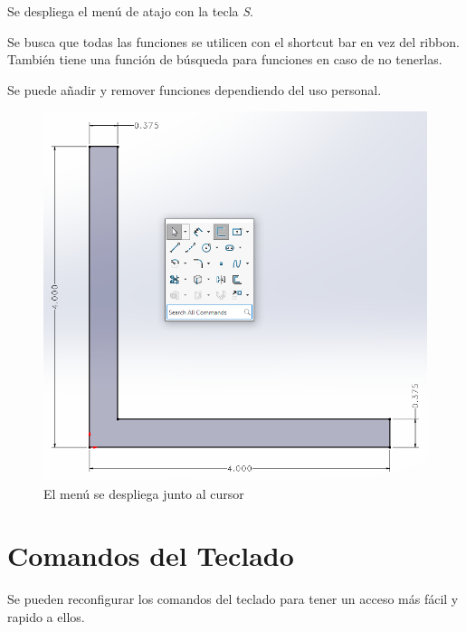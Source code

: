 \documentclass[12pt,letterpaper,final]{report}
\begin{document}
Se despliega el menú de atajo con la tecla \emph{S}.

Se busca que todas las funciones se utilicen con el shortcut bar en vez del ribbon. También tiene una función de búsqueda para funciones en caso de no tenerlas.

Se puede añadir y remover funciones dependiendo del uso personal.

\begin{figure}[H]
	\centering
	\includegraphics[width=0.85\linewidth, height=0.5\textheight,keepaspectratio]{Imagenes/solidworks_shortcutbars_07}
	\caption{El menú se despliega junto al cursor}
	\label{fig:solidworksshortcutbars07}
\end{figure}



\chapter{Comandos del Teclado}

Se pueden reconfigurar los comandos del teclado para tener un acceso más fácil y rapido a ellos.
\end{document}
